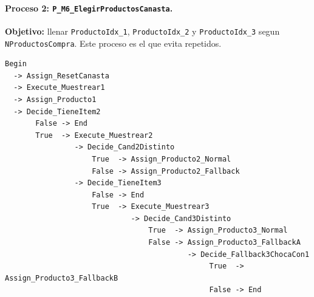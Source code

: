\documentclass[11pt]{article}
\newcommand{\state}[1]{\texttt{#1}}
\newcommand{\proc}[1]{\texttt{#1}}
\begin{document}
\paragraph{Proceso 2: \proc{P\_M6\_ElegirProductosCanasta}.}
\textbf{Objetivo:} llenar \state{ProductoIdx\_1}, \state{ProductoIdx\_2} y \state{ProductoIdx\_3} segun \state{NProductosCompra}. Este proceso es el que evita repetidos.

\begin{lstlisting}[caption={Diagrama corto de P M6 ElegirProductosCanasta}]
Begin
  -> Assign_ResetCanasta
  -> Execute_Muestrear1
  -> Assign_Producto1
  -> Decide_TieneItem2
       False -> End
       True  -> Execute_Muestrear2
                -> Decide_Cand2Distinto
                    True  -> Assign_Producto2_Normal
                    False -> Assign_Producto2_Fallback
                -> Decide_TieneItem3
                    False -> End
                    True  -> Execute_Muestrear3
                             -> Decide_Cand3Distinto
                                 True  -> Assign_Producto3_Normal
                                 False -> Assign_Producto3_FallbackA
                                          -> Decide_Fallback3ChocaCon1
                                               True  -> Assign_Producto3_FallbackB
                                               False -> End
\end{lstlisting}
\end{document}
